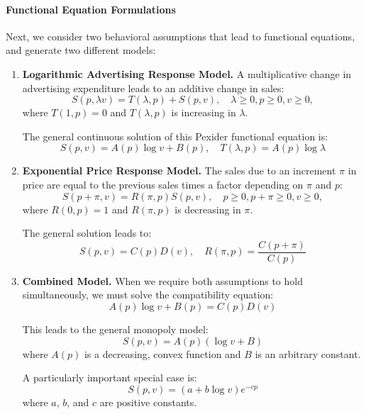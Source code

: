 \paragraph{Functional Equation Formulations}
Next, we consider two behavioral assumptions that lead to functional equations, and generate two different models:
\begin{enumerate}
\item {\bf Logarithmic Advertising Response Model.}
A multiplicative change in advertising expenditure leads to an additive change in sales:
\begin{equation}
S(p, \lambda v) = T(\lambda, p) + S(p, v), \quad \lambda \geq 0, p \geq 0, v \geq 0,
\end{equation}
where $T(1, p) = 0$ and $T(\lambda, p)$ is increasing in $\lambda$.

The general continuous solution of this Pexider functional equation is:
\begin{equation}
\boxed{S(p, v) = A(p) \log v + B(p), \quad T(\lambda, p) = A(p) \log \lambda}
\end{equation}

\item {\bf Exponential Price Response Model.}
The sales due to an increment $\pi$ in price are equal to the previous sales times a factor depending on $\pi$ and $p$:
\begin{equation}
S(p + \pi, v) = R(\pi, p)S(p, v), \quad p \geq 0, p+\pi \geq 0, v \geq 0,
\end{equation}
where $R(0, p) = 1$ and $R(\pi, p)$ is decreasing in $\pi$.

The general solution leads to:
\begin{equation}
\boxed{S(p, v) = C(p)D(v), \quad R(\pi, p) = \frac{C(p + \pi)}{C(p)}}
\end{equation}

\item {\bf Combined Model.}
When we require both assumptions to hold simultaneously, we must solve the compatibility equation:
\begin{equation}
A(p) \log v + B(p) = C(p)D(v)
\end{equation}

This leads to the general monopoly model:
\begin{equation}
\boxed{S(p, v) = A(p)(\log v + B)}
\end{equation}
where $A(p)$ is a decreasing, convex function and $B$ is an arbitrary constant.

A particularly important special case is:
\begin{equation}
S(p, v) = (a + b \log v) e^{-cp}
\end{equation}
where $a$, $b$, and $c$ are positive constants.
\end{enumerate}

